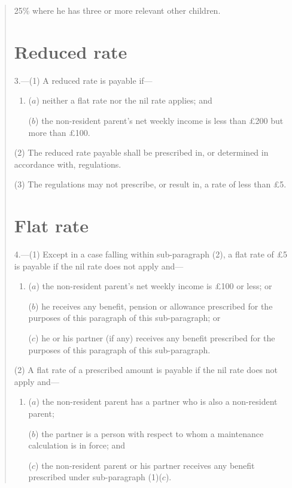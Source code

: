 \documentclass[12pt,a4paper]{article}
\begin{document}
\begin{quotation}
\begin{enumerate}
    25\% where he has three or more relevant other children. 
\end{enumerate}

\section*{Reduced rate}

3.---(1) A reduced rate is payable if—
\begin{enumerate}\item[]
($a$) neither a flat rate nor the nil rate applies; and

($b$) the non-resident parent’s net weekly income is less than £200 but more than £100. 
\end{enumerate}

(2) The reduced rate payable shall be prescribed in, or determined in accordance with, regulations.

(3) The regulations may not prescribe, or result in, a rate of less than £5. 

\section*{Flat rate}

4.---(1) Except in a case falling within sub-paragraph (2), a flat rate of £5 is payable if the nil rate does not apply and—
\begin{enumerate}\item[]
($a$) the non-resident parent’s net weekly income is £100 or less; or

($b$) he receives any benefit, pension or allowance prescribed for the purposes of this paragraph of this sub-paragraph; or

($c$) he or his partner (if any) receives any benefit prescribed for the purposes of this paragraph of this sub-paragraph.
\end{enumerate}

(2) A flat rate of a prescribed amount is payable if the nil rate does not apply and—
\begin{enumerate}\item[]
($a$) the non-resident parent has a partner who is also a non-resident parent;

($b$) the partner is a person with respect to whom a maintenance calculation is in force; and

($c$) the non-resident parent or his partner receives any benefit prescribed under sub-paragraph (1)($c$).
\end{enumerate}


\end{quotation}
\end{document}
